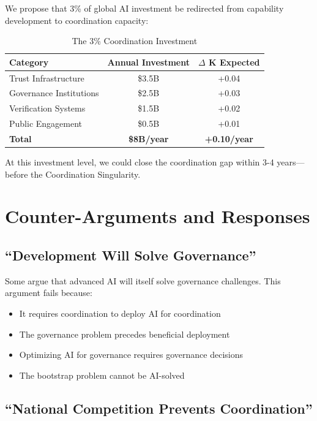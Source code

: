 \documentclass[11pt,letterpaper]{article}
\begin{document}
We propose that 3\% of global AI investment be redirected from capability development to coordination capacity:

\begin{table}[H]
\centering
\caption{The 3\% Coordination Investment}
\begin{tabular}{lcc}
\toprule
\textbf{Category} & \textbf{Annual Investment} & \textbf{$\Delta$ K Expected} \\
\midrule
Trust Infrastructure & \$3.5B & +0.04 \\
Governance Institutions & \$2.5B & +0.03 \\
Verification Systems & \$1.5B & +0.02 \\
Public Engagement & \$0.5B & +0.01 \\
\midrule
\textbf{Total} & \textbf{\$8B/year} & \textbf{+0.10/year} \\
\bottomrule
\end{tabular}
\label{tab:investment}
\end{table}

At this investment level, we could close the coordination gap within 3-4 years---before the Coordination Singularity.

\section{Counter-Arguments and Responses}

\subsection{``Development Will Solve Governance''}

Some argue that advanced AI will itself solve governance challenges. This argument fails because:
\begin{itemize}
\item It requires coordination to deploy AI for coordination
\item The governance problem precedes beneficial deployment
\item Optimizing AI for governance requires governance decisions
\item The bootstrap problem cannot be AI-solved
\end{itemize}

\subsection{``National Competition Prevents Coordination''}
\end{document}
